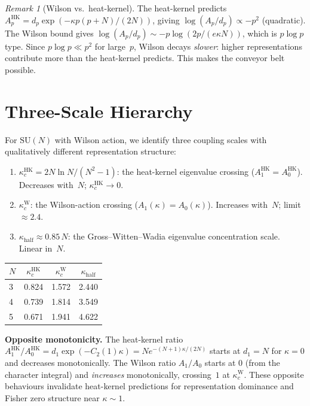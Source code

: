 \documentclass[12pt]{article}
\theoremstyle{definition}
\theoremstyle{remark}
\newtheorem{remark}[theorem]{Remark}
\newcommand{\SU}{\mathrm{SU}}
\begin{document}
\begin{remark}[Wilson vs.\ heat-kernel]
The heat-kernel predicts $A_p^{\mathrm{HK}} = d_p \exp(-\kappa p(p+N)/(2N))$,
giving $\log(A_p/d_p) \propto -p^2$ (quadratic). The Wilson bound
gives $\log(A_p/d_p) \sim -p \log(2p/(e\kappa N))$, which is $p \log p$ type.
Since $p \log p \ll p^2$ for large~$p$, Wilson decays \emph{slower}:
higher representations contribute more than the heat-kernel predicts.
This makes the conveyor belt possible.
\end{remark}


\section{Three-Scale Hierarchy}\label{sec:hierarchy}

For $\SU(N)$ with Wilson action, we identify three coupling scales with
qualitatively different representation structure:

\begin{enumerate}
\item $\kappa_c^{\mathrm{HK}} = 2N\ln N / (N^2 - 1)$:
  the heat-kernel eigenvalue crossing ($A_1^{\mathrm{HK}} = A_0^{\mathrm{HK}}$).
  Decreases with~$N$; $\kappa_c^{\mathrm{HK}} \to 0$.

\item $\kappa_c^{\mathrm{W}}$: the Wilson-action crossing
  ($A_1(\kappa) = A_0(\kappa)$). Increases with~$N$; limit $\approx 2.4$.

\item $\kappa_{\mathrm{half}} \approx 0.85\,N$:
  the Gross--Witten--Wadia eigenvalue concentration scale.
  Linear in~$N$.
\end{enumerate}

\begin{center}
\begin{tabular}{lccc}
\toprule
$N$ & $\kappa_c^{\mathrm{HK}}$ & $\kappa_c^{\mathrm{W}}$ &
$\kappa_{\mathrm{half}}$ \\
\midrule
3 & 0.824 & 1.572 & 2.440 \\
4 & 0.739 & 1.814 & 3.549 \\
5 & 0.671 & 1.941 & 4.622 \\
\bottomrule
\end{tabular}
\end{center}

\noindent
\textbf{Opposite monotonicity.} The heat-kernel ratio
$A_1^{\mathrm{HK}}/A_0^{\mathrm{HK}} = d_1 \exp(-C_2(1)\kappa) = N e^{-(N+1)\kappa/(2N)}$
starts at $d_1 = N$ for $\kappa = 0$ and decreases monotonically.
The Wilson ratio $A_1/A_0$ starts at $0$ (from the character integral)
and \emph{increases} monotonically, crossing~$1$ at $\kappa_c^{\mathrm{W}}$.
These opposite behaviours invalidate heat-kernel predictions for
representation dominance and Fisher zero structure near $\kappa \sim 1$.
\end{document}
